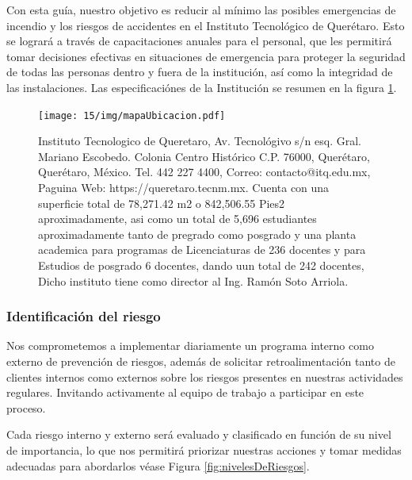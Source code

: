     Con esta guía, nuestro objetivo es reducir al mínimo las posibles emergencias de incendio y los riesgos de accidentes en el Instituto Tecnológico de Querétaro. Esto se logrará a través de capacitaciones anuales para el personal, que les permitirá tomar decisiones efectivas en situaciones de emergencia para proteger la seguridad de todas las personas dentro y fuera de la institución, así como la integridad de las instalaciones. Las especificaciónes de la Institución se resumen en la figura \ref{fig:mapaUbicacion}.
    
    \begin{figure}[H]
        \centering
        \texttt{[image: 15/img/mapaUbicacion.pdf]}
        \caption{Instituto Tecnologico de Queretaro, Av. Tecnológivo s/n esq. Gral. Mariano Escobedo. Colonia Centro Histórico C.P. 76000, Querétaro, Querétaro, México. Tel. 442 227 4400, Correo: contacto@itq.edu.mx, Paguina Web: https://queretaro.tecnm.mx. 
        Cuenta con una	superficie total de 78,271.42 m2 o 842,506.55 Pies2 aproximadamente, asi como un total de 5,696 estudiantes aproximadamente tanto de pregrado como posgrado y una planta academica para programas de Licenciaturas de 236 docentes y para Estudios de posgrado 6 docentes, dando uun total de 242 docentes, Dicho instituto tiene como director al Ing. Ramón Soto Arriola. }
        \label{fig:mapaUbicacion}
    \end{figure}
    
    \subsubsection{Identificación del riesgo}
    
    Nos comprometemos a implementar diariamente un programa interno como externo de prevención de riesgos, además de solicitar retroalimentación tanto de clientes internos como externos sobre los riesgos presentes en nuestras actividades regulares. Invitando activamente al equipo de trabajo a participar en este proceso. 
    
    Cada riesgo interno y externo será evaluado y clasificado en función de su nivel de importancia, lo que nos permitirá priorizar nuestras acciones y tomar medidas adecuadas para abordarlos véase Figura \ref{fig:nivelesDeRiesgos}.
    
